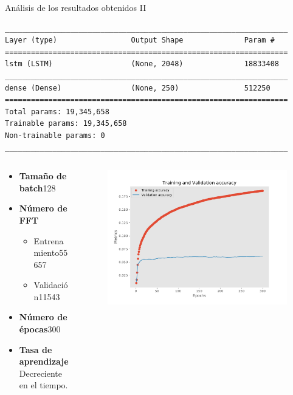 \begin{frame}[fragile]{Análisis de los resultados obtenidos II}
\begin{lstlisting}[basicstyle=\tiny\ttfamily, caption={Resumen del modelo mono-capa},captionpos=b, label={lst: model_resume_monolayer},frame=none, xleftmargin=.2\textwidth, xrightmargin=.2\textwidth]
_________________________________________________________________
Layer (type)                 Output Shape              Param #   
=================================================================
lstm (LSTM)                  (None, 2048)              18833408  
_________________________________________________________________
dense (Dense)                (None, 250)               512250    
=================================================================
Total params: 19,345,658
Trainable params: 19,345,658
Non-trainable params: 0
_________________________________________________________________
\end{lstlisting}
\begin{columns}
	\begin{column}{0.5\textwidth}
		\begin{itemize}
			\item \textbf{Tamaño de batch}128
			\item \textbf{Número de FFT}
			\begin{itemize}
				\scriptsize
				\item Entrenamiento55657
				\item Validación11543
			\end{itemize}
			\item \textbf{Número de épocas}300\
			\item \textbf{Tasa de aprendizaje}Decreciente en el tiempo.
		\end{itemize}
	\end{column}
	\begin{column}[t]{0.5\textwidth}
		\vspace*{-50pt}
		\begin{figure}[t!]
			\centering
			\includegraphics[width=0.9\columnwidth]{../figures/results_acc_compa.pdf}

\end{figure}
\end{column}
\end{columns}
\end{frame}
